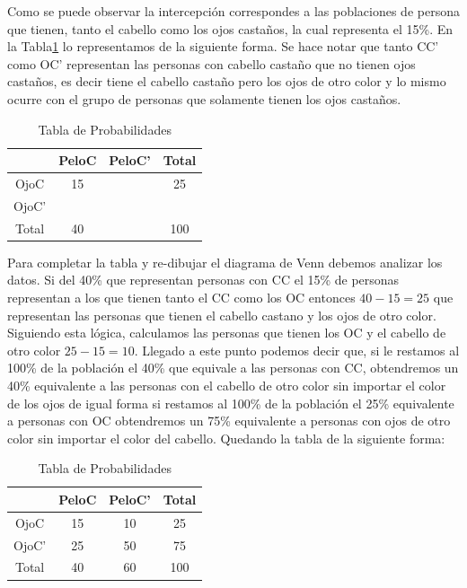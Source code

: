 \documentclass[11pt,letterpaper]{report}
\begin{document}
        Como se puede observar la intercepción correspondes a las poblaciones de persona que tienen, tanto el cabello como los ojos castaños, la cual representa el 15\%. En la Tabla\ref*{tab:prob} lo representamos de la siguiente forma. Se hace notar que tanto CC' como OC' representan las personas con cabello castaño que no tienen ojos castaños, es decir tiene el cabello castaño pero los ojos de otro color y lo mismo ocurre con el grupo de personas que solamente tienen los ojos castaños.

        \begin{table}[!h]
            \centering
            \caption{Tabla de Probabilidades}

            \begin{tabular}{c|cc|c}
                 & PeloC & PeloC' & Total \\
                \hline
                OjoC & 15 &  & 25 \\
                OjoC' &  &  &  \\
                \hline
                Total & 40 &  & 100 \\
            \end{tabular}

            \label{tab:prob}
        \end{table}

        Para completar la tabla y re-dibujar el diagrama de Venn debemos analizar los datos. Si del 40\% que representan personas con CC el 15\% de personas representan a los que tienen tanto el CC como los OC entonces $40-15=25$ que representan las personas que tienen el cabello castano y los ojos de otro color. Siguiendo esta lógica, calculamos las personas que tienen los OC y el cabello de otro color $25-15= 10$. Llegado a este punto podemos decir que, si le restamos al 100\% de la población el 40\% que equivale a las personas con CC, obtendremos un 40\% equivalente a las personas con el cabello de otro color sin importar el color de los ojos de igual forma si restamos al 100\% de la población el 25\% equivalente a personas con OC obtendremos un 75\% equivalente a personas con ojos de otro color sin importar el color del cabello. Quedando la tabla de la siguiente forma:

        \begin{table}[!h]
          \centering
          \caption{Tabla de Probabilidades}

            \begin{tabular}{c|cc|c}
              & PeloC & PeloC' & Total \\
              \hline
              OjoC & 15 & 10 & 25 \\
              OjoC' & 25 & 50 & 75  \\
              \hline
              Total & 40 & 60 & 100 \\
            \end{tabular}
          \label{tab:probb}
        \end{table}
\end{document}
